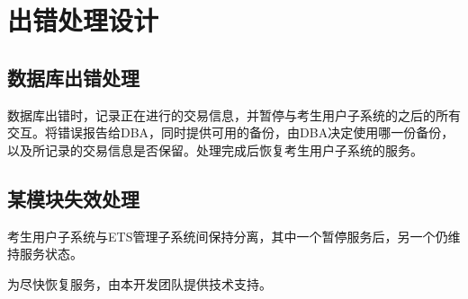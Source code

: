 \chapter{出错处理设计}
\section{数据库出错处理}
数据库出错时，记录正在进行的交易信息，并暂停与考生用户子系统的之后的所有交互。将错误报告给DBA，同时提供可用的备份，由DBA决定使用哪一份备份，以及所记录的交易信息是否保留。处理完成后恢复考生用户子系统的服务。

\section{某模块失效处理}

考生用户子系统与ETS管理子系统间保持分离，其中一个暂停服务后，另一个仍维持服务状态。

为尽快恢复服务，由本开发团队提供技术支持。